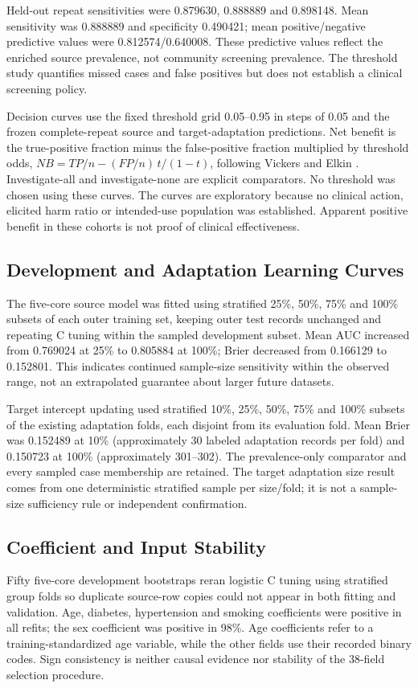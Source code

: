 \documentclass[conference,10pt]{IEEEtran}
\begin{document}
Held-out repeat sensitivities were 0.879630, 0.888889 and 0.898148. Mean sensitivity was 0.888889 and specificity 0.490421; mean positive/negative predictive values were 0.812574/0.640008. These predictive values reflect the enriched source prevalence, not community screening prevalence. The threshold study quantifies missed cases and false positives but does not establish a clinical screening policy.

Decision curves use the fixed threshold grid 0.05--0.95 in steps of 0.05 and the frozen complete-repeat source and target-adaptation predictions. Net benefit is the true-positive fraction minus the false-positive fraction multiplied by threshold odds, $NB=TP/n-(FP/n)\,t/(1-t)$, following Vickers and Elkin \cite{r10}. Investigate-all and investigate-none are explicit comparators. No threshold was chosen using these curves. The curves are exploratory because no clinical action, elicited harm ratio or intended-use population was established. Apparent positive benefit in these cohorts is not proof of clinical effectiveness.

\subsection{Development and Adaptation Learning Curves}
The five-core source model was fitted using stratified 25\%, 50\%, 75\% and 100\% subsets of each outer training set, keeping outer test records unchanged and repeating C tuning within the sampled development subset. Mean AUC increased from 0.769024 at 25\% to 0.805884 at 100\%; Brier decreased from 0.166129 to 0.152801. This indicates continued sample-size sensitivity within the observed range, not an extrapolated guarantee about larger future datasets.

Target intercept updating used stratified 10\%, 25\%, 50\%, 75\% and 100\% subsets of the existing adaptation folds, each disjoint from its evaluation fold. Mean Brier was 0.152489 at 10\% (approximately 30 labeled adaptation records per fold) and 0.150723 at 100\% (approximately 301--302). The prevalence-only comparator and every sampled case membership are retained. The target adaptation size result comes from one deterministic stratified sample per size/fold; it is not a sample-size sufficiency rule or independent confirmation.

\subsection{Coefficient and Input Stability}
Fifty five-core development bootstraps reran logistic C tuning using stratified group folds so duplicate source-row copies could not appear in both fitting and validation. Age, diabetes, hypertension and smoking coefficients were positive in all refits; the sex coefficient was positive in 98\%. Age coefficients refer to a training-standardized age variable, while the other fields use their recorded binary codes. Sign consistency is neither causal evidence nor stability of the 38-field selection procedure.
\end{document}
